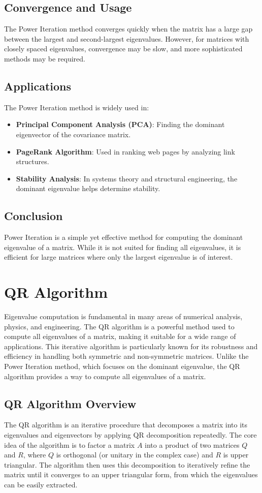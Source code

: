 \documentclass[journal]{IEEEtran}
\begin{document}
\subsection{Convergence and Usage}
The Power Iteration method converges quickly when the matrix has a large gap between the largest and second-largest eigenvalues. However, for matrices with closely spaced eigenvalues, convergence may be slow, and more sophisticated methods may be required.

\subsection{Applications}
The Power Iteration method is widely used in:
\begin{itemize}
    \item \textbf{Principal Component Analysis (PCA)}: Finding the dominant eigenvector of the covariance matrix.
    \item \textbf{PageRank Algorithm}: Used in ranking web pages by analyzing link structures.
    \item \textbf{Stability Analysis}: In systems theory and structural engineering, the dominant eigenvalue helps determine stability.
\end{itemize}

\subsection{Conclusion}
Power Iteration is a simple yet effective method for computing the dominant eigenvalue of a matrix. While it is not suited for finding all eigenvalues, it is efficient for large matrices where only the largest eigenvalue is of interest.
\section{\textbf{QR Algorithm}}
Eigenvalue computation is fundamental in many areas of numerical analysis, physics, and engineering. The QR algorithm is a powerful method used to compute all eigenvalues of a matrix, making it suitable for a wide range of applications. This iterative algorithm is particularly known for its robustness and efficiency in handling both symmetric and non-symmetric matrices. Unlike the Power Iteration method, which focuses on the dominant eigenvalue, the QR algorithm provides a way to compute all eigenvalues of a matrix.

\subsection{QR Algorithm Overview}
The QR algorithm is an iterative procedure that decomposes a matrix into its eigenvalues and eigenvectors by applying QR decomposition repeatedly. The core idea of the algorithm is to factor a matrix $A$ into a product of two matrices $Q$ and $R$, where $Q$ is orthogonal (or unitary in the complex case) and $R$ is upper triangular. The algorithm then uses this decomposition to iteratively refine the matrix until it converges to an upper triangular form, from which the eigenvalues can be easily extracted.
\end{document}
